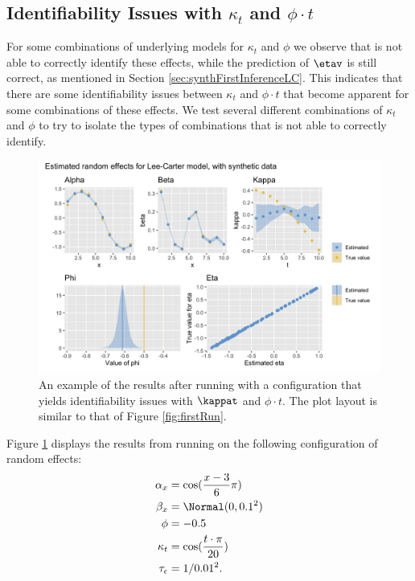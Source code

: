 \subsection{Identifiability Issues with $\kappa_t$ and $\phi\cdot t$}
\label{sec:IdentifiabilityKappa}
For some combinations of underlying models for $\kappa_t$ and $\phi$ we observe that \inlabru is not able to correctly identify these effects, while the prediction of $\etav$ is still correct, as mentioned in Section \ref{sec:synthFirstInferenceLC}. This indicates that there are some identifiability issues between $\kappa_t$ and $\phi \cdot t$ that become apparent for some combinations of these effects. We test several different combinations of $\kappa_t$ and $\phi$ to try to isolate the types of combinations that \inlabru is not able to correctly identify.
\begin{figure}[h!]
    \centering
    \includegraphics[width=0.85\linewidth]{synthetic-data/Figures/effects-LC-synthetic-identifiability.png}
    \caption{An example of the results after running \inlabru with a configuration that yields identifiability issues with $\kappat$ and $\phi \cdot t$. The plot layout is similar to that of Figure \ref{fig:firstRun}.}
    \label{fig:unidentifiabilityKappa}
\end{figure}
Figure \ref{fig:unidentifiabilityKappa} displays the results from running \inlabru on the following configuration of random effects:
\begin{equation}
    \begin{aligned}
    \alpha_x &= \cos(\frac{x-3}{6}\pi)\\
    \beta_x &= \Normal(0,0.1^2)\\
    \phi &= -0.5\\
    \kappa_t &= \cos(\frac{t\cdot \pi}{20})\\
    \tau_{\epsilon} &= 1/0.01^2.
    \end{aligned}
\end{equation}
